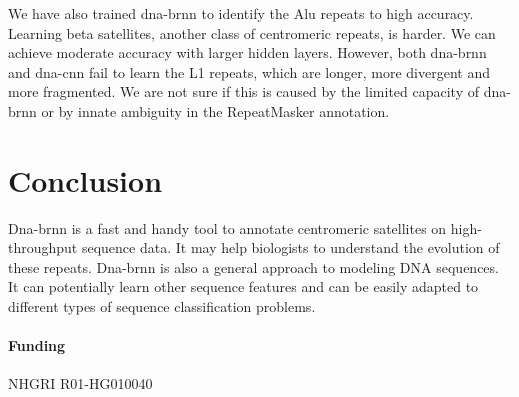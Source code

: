 \documentclass{bioinfo}
\begin{document}
We have also trained dna-brnn to identify the Alu repeats to high accuracy.
Learning beta satellites, another class of centromeric repeats, is harder. We
can achieve moderate accuracy with larger hidden layers. However, both dna-brnn
and dna-cnn fail to learn the L1 repeats, which are longer, more divergent and
more fragmented. We are not sure if this is caused by the limited capacity of
dna-brnn or by innate ambiguity in the RepeatMasker annotation.

\section{Conclusion}

Dna-brnn is a fast and handy tool to annotate centromeric satellites on
high-throughput sequence data. It may help biologists to understand the
evolution of these repeats. Dna-brnn is also a general approach to modeling DNA
sequences. It can potentially learn other sequence features and can be easily
adapted to different types of sequence classification problems.

\paragraph{Funding\textcolon} NHGRI R01-HG010040


\end{document}
